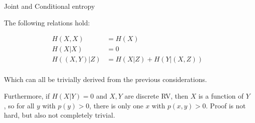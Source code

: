 \documentclass[11pt,compress,t,notes=noshow, xcolor=table]{beamer}
\begin{document}

\begin{vbframe} {Joint and Conditional entropy}

The following relations hold:

\begin{equation*}
\begin{aligned}
H(X, X)       &= H(X)  \\
H(X | X)      &= 0  \\
H( (X, Y) | Z)   &=H(X | Z)+H(Y | (X, Z))\\
\end{aligned}
\end{equation*}

Which can all be trivially derived from the previous considerations.

\lz

Furthermore, if $H(X|Y) = 0$ and $X,Y$ are discrete RV, then $X$ is a function of $Y$, so for all $y$ with $p(y)>0$, there is only one $x$ with $p(x,y)>0$. 
Proof is not hard, but also not completely trivial.
\end{vbframe}
\end{document}
